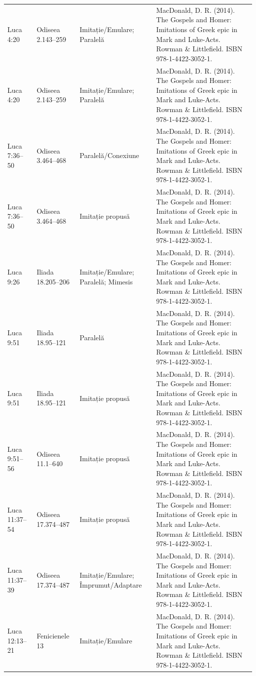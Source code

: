 \documentclass[12pt,a4paper,twoside,openany]{book}
\begin{document}
\begin{longtable}{L{1.4cm}L{1.7cm}L{3.1cm}L{8.4cm}}
Luca 4:20 & Odiseea 2.143–259 & Imitație/Emulare; Paralelă & MacDonald, D. R. (2014). The Gospels and Homer: Imitations of Greek epic in Mark and Luke-Acts. Rowman \& Littlefield. ISBN 978-1-4422-3052-1. \\
Luca 4:20 & Odiseea 2.143–259 & Imitație/Emulare; Paralelă & MacDonald, D. R. (2014). The Gospels and Homer: Imitations of Greek epic in Mark and Luke-Acts. Rowman \& Littlefield. ISBN 978-1-4422-3052-1. \\
Luca 7:36–50 & Odiseea 3.464–468 & Paralelă/Conexiune & MacDonald, D. R. (2014). The Gospels and Homer: Imitations of Greek epic in Mark and Luke-Acts. Rowman \& Littlefield. ISBN 978-1-4422-3052-1. \\
Luca 7:36–50 & Odiseea 3.464–468 & Imitație propusă & MacDonald, D. R. (2014). The Gospels and Homer: Imitations of Greek epic in Mark and Luke-Acts. Rowman \& Littlefield. ISBN 978-1-4422-3052-1. \\
Luca 9:26 & Iliada 18.205–206 & Imitație/Emulare; Paralelă; Mimesis & MacDonald, D. R. (2014). The Gospels and Homer: Imitations of Greek epic in Mark and Luke-Acts. Rowman \& Littlefield. ISBN 978-1-4422-3052-1. \\
Luca 9:51 & Iliada 18.95–121 & Paralelă & MacDonald, D. R. (2014). The Gospels and Homer: Imitations of Greek epic in Mark and Luke-Acts. Rowman \& Littlefield. ISBN 978-1-4422-3052-1. \\
Luca 9:51 & Iliada 18.95–121 & Imitație propusă & MacDonald, D. R. (2014). The Gospels and Homer: Imitations of Greek epic in Mark and Luke-Acts. Rowman \& Littlefield. ISBN 978-1-4422-3052-1. \\
Luca 9:51–56 & Odiseea 11.1–640 & Imitație propusă & MacDonald, D. R. (2014). The Gospels and Homer: Imitations of Greek epic in Mark and Luke-Acts. Rowman \& Littlefield. ISBN 978-1-4422-3052-1. \\
Luca 11:37–54 & Odiseea 17.374–487 & Imitație propusă & MacDonald, D. R. (2014). The Gospels and Homer: Imitations of Greek epic in Mark and Luke-Acts. Rowman \& Littlefield. ISBN 978-1-4422-3052-1. \\
Luca 11:37–39 & Odiseea 17.374–487 & Imitație/Emulare; Împrumut/Adaptare & MacDonald, D. R. (2014). The Gospels and Homer: Imitations of Greek epic in Mark and Luke-Acts. Rowman \& Littlefield. ISBN 978-1-4422-3052-1. \\
Luca 12:13–21 & Fenicienele 13 & Imitație/Emulare & MacDonald, D. R. (2014). The Gospels and Homer: Imitations of Greek epic in Mark and Luke-Acts. Rowman \& Littlefield. ISBN 978-1-4422-3052-1. \\

\end{longtable}
\end{document}
